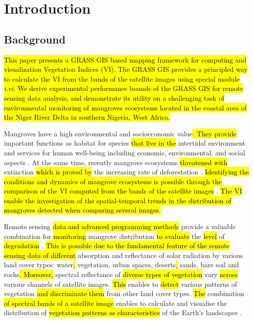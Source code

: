 \documentclass[jmse,article,submit,pdftex,moreauthors]{Definitions/mdpi}
\begin{document}
\section{Introduction}

\subsection{Background}

\hl{This paper presents a GRASS GIS based mapping framework for computing and visualization Vegetation Indices (VI). The GRASS GIS provides a principled way to calculate the VI from the bands of the satellite images using special module \emph{i.vi}. We derive experimental performance bounds of the GRASS GIS for remote sensing data analysis, and demonstrate its utility on a challenging task of environmental monitoring of mangroves ecosystems located in the coastal area of the Niger River Delta in southern Nigeria, West Africa.}

Mangroves have a high environmental and socioeconomic value\hl{. They provide }important functions as habitat for species \hl{that live in the }intertidal environment \cite{James} and services for human well-being including economic, environmental, and social aspects \cite{AKANNI2018387}. At the same time, recently mangrove ecosystems \hl{threatened with} extinction \hl{which is proved by} the increasing rate of deforestation \cite{Enaruvbe2016,Numbere2021,Osuji,Fasona}. \hl{Identifying the conditions and dynamics of mangrove ecosystems is possible through the comparison of the VI computed from the bands of the satellite images} \cite{HATI2022,ALATORRE201698,SATHISH2021102054}. \hl{The VI enable the investigation of the spatial-temporal trends in the distribution of mangroves detected when comparing several images. }

Remote sensing \hl{data and advanced programming methods} provide a valuable combination for \hl{monitoring }mangrove distribution \hl{to evaluate} the \hl{level} of \hl{degradation} \cite{Hu}. \hl{This is possible due to the fundamental feature of the remote sensing data of different} absorption and reflectance of solar radiation by various land cover types: water\hl{, }vegetation, urban spaces, deserts\hl{, }sands, bare soil and rocks\hl{. Moreover,} spectral reflectance of \hl{diverse types of vegetation} vary \hl{across} various channels of satellite images. \hl{This} enables to \hl{detect} various patterns of vegetation \hl{and discriminate them }from other land cover types. \hl{The} combination \hl{of spectral bands of a satellite image }enables to calculate and visualise the distribution of \hl{vegetation patterns as characteristics} of the Earth's landscapes \cite{CHOPADE2023118839,GITAU2023102898,MISHRA2021107486}.
\end{document}
